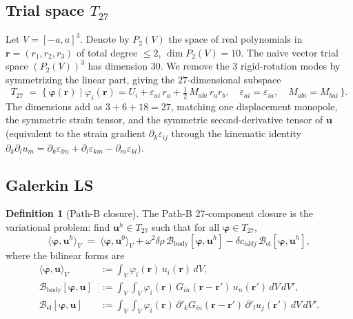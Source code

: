 \documentclass[11pt,a4paper]{article}
\newcommand{\br}{\bm{r}}
\newcommand{\bu}{\bm{u}}
\newcommand{\bphi}{\bm{\varphi}}
\theoremstyle{plain}
\theoremstyle{definition}
\newtheorem{definition}[theorem]{Definition}
\theoremstyle{remark}
\begin{document}
\subsection{Trial space \texorpdfstring{$T_{27}$}{T27}}

Let $V = [-a,a]^{3}$.  Denote by $P_{2}(V)$ the space of real polynomials
in $\br = (r_1,r_2,r_3)$ of total degree $\le 2$, $\dim P_{2}(V) = 10$. The naive
vector trial space $(P_{2}(V))^{3}$ has dimension $30$.  We remove the
$3$ rigid-rotation modes by symmetrizing the linear part, giving the
$27$-dimensional subspace
\begin{equation}
   T_{27} \;=\; \Big\{\,\bphi(\br)\;\Big|\;
   \varphi_i(\br) = U_i + \varepsilon_{ai}\, r_a + \tfrac{1}{2}\,M_{abi}\, r_a r_b,\quad
   \varepsilon_{ai} = \varepsilon_{ia},\quad M_{abi} = M_{bai}\,\Big\}.
\end{equation}
The dimensions add as $3 + 6 + 18 = 27$, matching one displacement
monopole, the symmetric strain tensor, and the symmetric second-derivative
tensor of $\bu$ (equivalent to the strain gradient $\partial_k\varepsilon_{ij}$
through the kinematic identity
$\partial_k\partial_l u_m = \partial_k\varepsilon_{lm} + \partial_l\varepsilon_{km} - \partial_m\varepsilon_{kl}$).

\subsection{Galerkin LS}

\begin{definition}[Path-B closure]
The Path-B 27-component closure is the variational problem:
find $\bu^{h}\in T_{27}$ such that for all $\bphi \in T_{27}$,
\begin{equation}
   \langle\bphi,\bu^{h}\rangle_V
   \;=\;
   \langle\bphi,\bu^{0}\rangle_V
   + \omega^{2}\delta\rho\, \mathcal{B}_{\text{body}}[\bphi,\bu^{h}]
   - \delta c_{nklj}\, \mathcal{B}_{\text{el}}[\bphi,\bu^{h}],
   \label{eq:galerkin-LS}
\end{equation}
where the bilinear forms are
\begin{align}
\langle\bphi,\bu\rangle_V &:= \int_{V} \varphi_i(\br)\, u_i(\br)\,dV, \\[2pt]
\mathcal{B}_{\text{body}}[\bphi,\bu] &:= \int_{V}\!\!\int_{V} \varphi_i(\br)\,
            G_{in}(\br-\br')\, u_n(\br')\,dV\,dV', \\[2pt]
\mathcal{B}_{\text{el}}[\bphi,\bu] &:= \int_{V}\!\!\int_{V} \varphi_i(\br)\,
            \partial'_k G_{in}(\br-\br')\, \partial'_l u_j(\br')\,dV\,dV'.
\end{align}
\end{definition}
\end{document}
